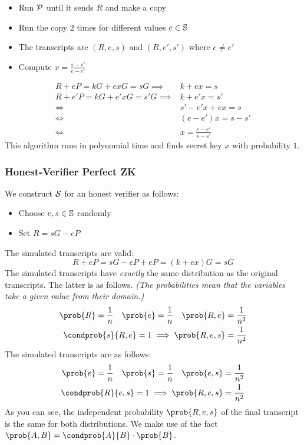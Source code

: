 \begin{itemize}
    \item Run $\mathcal{P}$ until it sends $R$ and make a copy
    \item Run the copy $2$ times for different values $e \in \mathbb{S}$
    \item The transcripts are $(R, e, s)$ and $(R, e', s')$ where $e \neq e'$
    \item Compute $x = \frac{s - s'}{e - e'}$
\end{itemize}
%
\begin{align*}
    R + eP = kG + exG = sG \implies& k + ex = s \\
    R + e'P = kG + e'xG = s'G \implies& k + e'x = s' \\
    \iff& s' - e'x + ex = s \\
    \iff& (e - e')x = s - s' \\
    \iff& x = \frac{e - e'}{s - s'}
\end{align*}
%
This algorithm runs in polynomial time and finds secret key $x$ with probability $1$.

\subsubsection{Honest-Verifier Perfect ZK}

We construct $\mathcal{S}$ for an honest verifier as follows:
%
\begin{itemize}
    \item Choose $e, s \in \mathbb{S}$ randomly
    \item Set $R = sG - eP$
\end{itemize}
%
The simulated transcripts are valid:
%
\[
    R + eP = sG - eP + eP = (k + ex)G = sG
\]
%
The simulated transcripts have \emph{exactly} the same distribution as the original transcripts.
The latter is as follows.
\emph{(The probabilities mean that the variables take a given value from their domain.)}
%
\begin{align*}
    \prob{R} = \frac{1}{n} \quad \prob{e} = \frac{1}{n} \quad \prob{R, e} = \frac{1}{n^2} \\
    \condprob{s}{R, e} = 1 \implies \prob{R, e, s} = \frac{1}{n^2}
\end{align*}
%
The simulated transcripts are as follows:
%
\begin{align*}
    \prob{e} = \frac{1}{n} \quad \prob{s} = \frac{1}{n} \quad \prob{e, s} = \frac{1}{n^2} \\
    \condprob{R}{e, s} = 1 \implies \prob{R, e, s} = \frac{1}{n^2}
\end{align*}
%
As you can see, the independent probability $\prob{R, e, s}$ of the final transcript is the same for both distributions.
We make use of the fact $\prob{A, B} = \condprob{A}{B} \cdot \prob{B}$.

